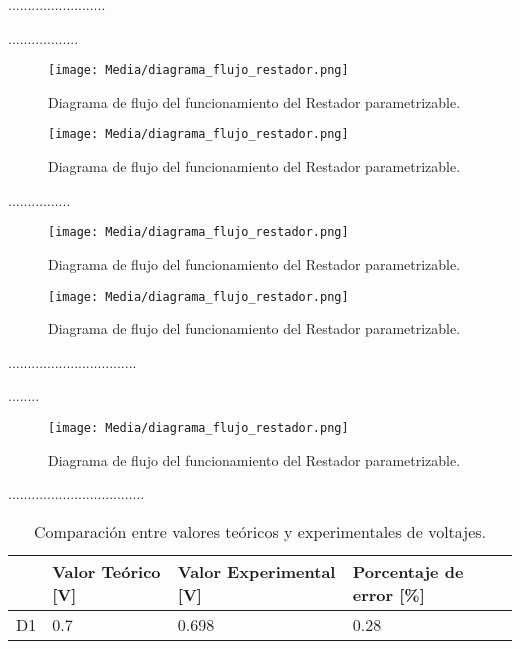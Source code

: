 \documentclass[journal]{IEEEtran}
\begin{document}
\par .........................
\par ..................


\begin{figure}[H]
    \centering
    \texttt{[image: Media/diagrama\_flujo\_restador.png]}
    \caption{Diagrama de flujo del funcionamiento del Restador parametrizable.}
    \label{fig:diagrama_flujo_restador}
\end{figure}

\begin{figure}[H]
    \centering
    \texttt{[image: Media/diagrama\_flujo\_restador.png]}
    \caption{Diagrama de flujo del funcionamiento del Restador parametrizable.}
    \label{fig:diagrama_flujo_restador}
\end{figure}

\par ................ 

\begin{figure}[H]
    \centering
    \texttt{[image: Media/diagrama\_flujo\_restador.png]}
    \caption{Diagrama de flujo del funcionamiento del Restador parametrizable.}
    \label{fig:diagrama_flujo_restador}
\end{figure}
\begin{figure}[H]
    \centering
    \texttt{[image: Media/diagrama\_flujo\_restador.png]}
    \caption{Diagrama de flujo del funcionamiento del Restador parametrizable.}
    \label{fig:diagrama_flujo_restador}
\end{figure}
\par .................................
\par ........
\begin{figure}[H]
    \centering
    \texttt{[image: Media/diagrama\_flujo\_restador.png]}
    \caption{Diagrama de flujo del funcionamiento del Restador parametrizable.}
    \label{fig:diagrama_flujo_restador}
\end{figure}
\par ...................................
\begin{table}[h]
\caption{Comparación entre valores teóricos y experimentales de voltajes.}
    \centering
    \renewcommand{\arraystretch}{1.2} %
    \begin{tabular}{|l|p{2cm}|p{2cm}|p{2cm}|}
        \hline
        & \textbf{Valor Teórico [V]} & \textbf{Valor Experimental [V]} & \textbf{Porcentaje de error [\%]} \\
        \hline
        D1 & 0.7  & 0.698  & 0.28 \\
        \hline
    \end{tabular}
    \label{tab:voltajes}
\end{table}
\end{document}
